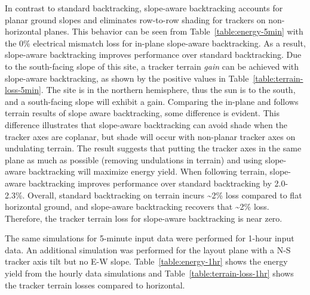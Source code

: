 \documentclass[conference]{IEEEtran}
\begin{document}
In contrast to standard backtracking, slope-aware backtracking accounts for planar ground slopes and eliminates row-to-row shading for trackers on non-horizontal planes. This behavior can be seen from Table~\ref{table:energy-5min} with the 0\% electrical mismatch loss for in-plane slope-aware backtracking. As a result, slope-aware backtracking improves performance over standard backtracking. Due to the south-facing slope of this site, a tracker terrain \textit{gain} can be achieved with slope-aware backtracking, as shown by the positive values in Table~\ref{table:terrain-loss-5min}. The site is in the northern hemisphere, thus the sun is to the south, and a south-facing slope will exhibit a gain. Comparing the in-plane and follows terrain results of slope aware backtracking, some difference is evident. This difference illustrates that slope-aware backtracking can avoid shade when the tracker axes are coplanar, but shade will occur with non-planar tracker axes on undulating terrain. The result suggests that putting the tracker axes in the same plane as much as possible (removing undulations in terrain) and using slope-aware backtracking will maximize energy yield. When following terrain, slope-aware backtracking improves performance over standard backtracking by 2.0-2.3\%. Overall, standard backtracking on terrain incurs \textasciitilde 2\% loss compared to flat horizontal ground, and slope-aware backtracking recovers that \textasciitilde 2\% loss. Therefore, the tracker terrain loss for slope-aware backtracking is near zero.

The same simulations for 5-minute input data were performed for 1-hour input data. An additional simulation was performed for the layout plane with a N-S tracker axis tilt but no E-W slope. Table~\ref{table:energy-1hr} shows the energy yield from the hourly data simulations and Table~\ref{table:terrain-loss-1hr} shows the tracker terrain losses compared to horizontal. 
\end{document}
